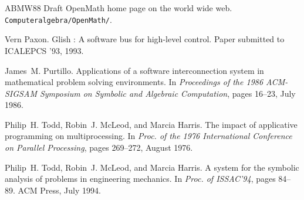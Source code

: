 \documentclass {article}
\begin{document}
\begin{thebibliography}{ABMW88}
Draft {OpenMath} home page on the world wide web.
 {\tt
  Computeralgebra/OpenMath/}.

Vern Paxon.
\newblock Glish : A software bus for high-level control.
\newblock Paper submitted to ICALEPCS '93, 1993.

James~M. Purtillo.
\newblock Applications of a software interconnection system in mathematical
  problem solving environments.
\newblock In {\em Proceedings of the 1986 ACM-SIGSAM Symposium on Symbolic and
  Algebraic Computation}, pages 16--23, July 1986.

Philip~H. Todd, Robin~J. McLeod, and Marcia Harris.
\newblock The impact of applicative programming on multiprocessing.
\newblock In {\em Proc. of the 1976 International Conference on Parallel
  Processing}, pages 269--272, August 1976.

Philip~H. Todd, Robin~J. McLeod, and Marcia Harris.
\newblock A system for the symbolic analysis of problems in engineering
  mechanics.
\newblock In {\em Proc. of ISSAC'94}, pages 84--89. ACM Press, July 1994.

\end{thebibliography}
\end{document}
